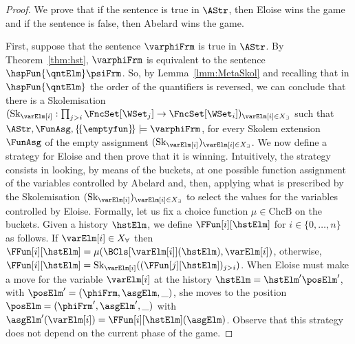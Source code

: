 \documentclass[authoryear]{elsarticle}
\newcommand{\TrvHypAsg}{\{\!\{\emptyfun\}\!\}}
\newcommand{\VarX}[1][]{{X_{#1}}}
\newcommand{\ChoiceFunsBuckets}{\text{ChcB}}
\newcommand{\choiceFunBucket}{\mu}
\newcommand{\SkolemizedSOF}{\text{Sk}}
\begin{document}
\thmgamthrsem*
%
\begin{proof}
  We prove that if the sentence is true in $\AStr$, then Eloise wins the game and
  if the sentence is false, then Abelard wins the game.

  First, suppose that the sentence $\varphiFrm$ is true in $\AStr$. By
  Theorem~\ref{thm:hst}, $\varphiFrm$ is equivalent to the \Meta sentence
  $\hspFun{\qntElm}\psiFrm$. So, by Lemma~\ref{lmm:MetaSkol} and recalling that
  in $\hspFun{\qntElm}$ the order of the quantifiers is reversed, we can
  conclude that there is a Skolemisation $(\SkolemizedSOF_{\varElm[i]} :
  \prod_{j>i} \FncSet[{\WSet_j}]{} \rightarrow \FncSet[{\WSet_i}]{})_{\varElm[i]
  \in \VarX[\exists]}$ such that $\AStr, \FunAsg, \TrvHypAsg \models
  \varphiFrm$, for every Skolem extension $\FunAsg$ of the empty assignment \wrt
  $(\SkolemizedSOF_{\varElm[i]})_{\varElm[i] \in \VarX[\exists]}$.
  We now define a strategy for Eloise and then prove that it is
  winning. Intuitively, the strategy consists in looking, by means of the
  buckets, at one possible function assignment of the variables controlled by
  Abelard and, then, applying what is prescribed by the Skolemisation
  $(\SkolemizedSOF_{\varElm[i]})_{\varElm[i] \in \VarX[\exists]}$ to select the
  values for the variables controlled by Eloise. Formally, let us fix a choice
  function $\choiceFunBucket \in \ChoiceFunsBuckets$ on the buckets. Given a
  history $\hstElm$, we define $\FFun[i][\hstElm]$ for $i\in\{0,\ldots,n\}$ as
  follows. If $\varElm[i] \in \VarX[\forall]$ then $\FFun[i][\hstElm] =
  \choiceFunBucket(\BCls[{\varElm[i]}](\hstElm), \varElm[i])$, otherwise,
  $\FFun[i][\hstElm] =
  \SkolemizedSOF_{\varElm[i]}((\FFun[j][\hstElm])_{j>i})$. When Eloise must make
  a move for the variable $\varElm[i]$ at the history $\hstElm = \hstElm'
  \posElm'$, with $\posElm' =(\phiFrm, \asgElm, \_)$, she moves to the position
  $\posElm = (\phiFrm', \asgElm', \_)$ with $\asgElm'(\varElm[i]) =
  \FFun[i][\hstElm](\asgElm)$. Observe that this strategy does not depend on the
  current phase of the game.


\end{proof}
\end{document}
